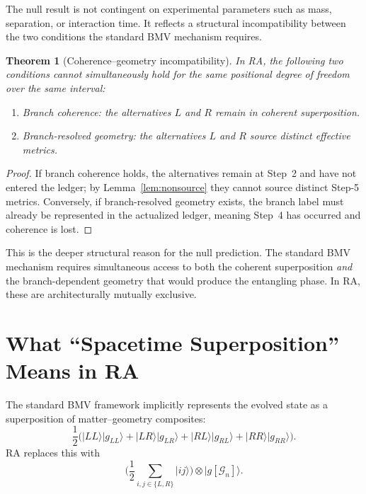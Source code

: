 \documentclass[12pt,a4paper]{article}
\newtheorem{theorem}{Theorem}[section]
\newcommand{\DAG}{\mathcal{G}}
\begin{document}
The null result is not contingent on experimental parameters such as
mass, separation, or interaction time. It reflects a structural
incompatibility between the two conditions the standard BMV mechanism
requires.

\begin{theorem}[Coherence--geometry incompatibility]
\label{thm:incomp}
In RA, the following two conditions cannot simultaneously hold for
the same positional degree of freedom over the same interval:
\begin{enumerate}[nosep]
\item \emph{Branch coherence:} the alternatives $L$ and $R$ remain
in coherent superposition.
\item \emph{Branch-resolved geometry:} the alternatives $L$ and $R$
source distinct effective metrics.
\end{enumerate}
\end{theorem}

\begin{proof}
If branch coherence holds, the alternatives remain at Step~2 and
have not entered the ledger; by Lemma~\ref{lem:nonsource} they
cannot source distinct Step-5 metrics. Conversely, if branch-resolved
geometry exists, the branch label must already be represented in the
actualized ledger, meaning Step~4 has occurred and coherence is lost.
\end{proof}

This is the deeper structural reason for the null prediction. The
standard BMV mechanism requires simultaneous access to both the
coherent superposition \emph{and} the branch-dependent geometry that
would produce the entangling phase. In RA, these are architecturally
mutually exclusive.

\section{What ``Spacetime Superposition'' Means in RA}
\label{sec:spacetime}

The standard BMV framework implicitly represents the evolved state
as a superposition of matter--geometry composites:
\begin{equation}
\frac{1}{2}\bigl(
|LL\rangle|g_{LL}\rangle
+ |LR\rangle|g_{LR}\rangle
+ |RL\rangle|g_{RL}\rangle
+ |RR\rangle|g_{RR}\rangle
\bigr).
\label{eq:standard_superposition}
\end{equation}
RA replaces this with
\begin{equation}
\biggl(\frac{1}{2}\sum_{i,j \in \{L,R\}} |ij\rangle\biggr)
\otimes |g[\DAG_n]\rangle.
\label{eq:ra_superposition}
\end{equation}
\end{document}
